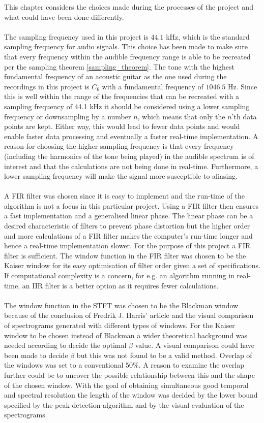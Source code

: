 This chapter considers the choices made during the processes of the project and what could have been done differently.
\\ \\
The sampling frequency used in this project is $44.1$ kHz, which is the standard sampling frequency for audio signals.
This choice has been made to make sure that every frequency within the audible frequency range is able to be recreated per the sampling theorem \ref{sampling_theorem}.
The tone with the highest fundamental frequency of an acoustic guitar as the one used during the recordings in this project is $C_6$ with a fundamental frequency of $1046.5$ Hz.
Since this is well within the range of the frequencies that can be recreated with a sampling frequency of 44.1 kHz it should be considered using a lower sampling frequency or downsampling by a number $n$, which means that only the $n$'th data points are kept. Either way, this would lead to fewer data points and would enable faster data processing and eventually a faster real-time implementation.
A reason for choosing the higher sampling frequency is that every frequency (including the harmonics of the tone being played) in the audible spectrum is of interest and that the calculations are not being done in real-time.
Furthermore, a lower sampling frequency will make the signal more susceptible to aliasing.
\\ \\
A FIR filter was chosen since it is easy to implement and the run-time of the algorithm is not a focus in this particular project. Using a FIR filter then ensures a fast implementation and a generalised linear phase. The linear phase can be a desired characteristic of filters to prevent phase distortion but the higher order and more calculations of a FIR filter makes the computer's run-time longer and hence a real-time implementation slower. For the purpose of this project a FIR filter is sufficient. The window function in the FIR filter was chosen to be the Kaiser window for its easy optimisation of filter order given a set of specifications. If computational complexity is a concern, for e.g. an algorithm running in real-time, an IIR filter is a better option as it requires fewer calculations.
\\ \\
The window function in the STFT was chosen to be the Blackman window because of the conclusion of Fredrik J. Harris' article and the visual comparison of spectrograms generated with different types of windows. For the Kaiser window to be chosen instead of Blackman a wider theoretical background was needed according to decide the optimal $\beta$ value. A visual comparison could have been made to decide $\beta$ but this was not found to be a valid method. Overlap of the windows was set to a conventional 50\%. A reason to examine the overlap further could be to uncover the possible relationship between this and the shape of the chosen window. With the goal of obtaining simultaneous good temporal and spectral resolution the length of the window was decided by the lower bound specified by the peak detection algorithm and by the visual evaluation of the spectrograms.
